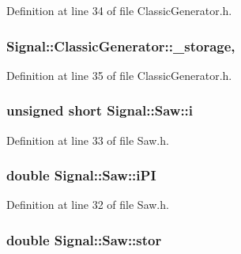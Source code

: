 Definition at line 34 of file Classic\+Generator.\+h.

\hypertarget{class_signal_1_1_classic_generator_a1214faf589eccb01631700723900bbf9}{
\subsubsection[{\+\_\+storage}]{ Signal\+::\+Classic\+Generator\+::\+\_\+storage\hspace{0.3cm}{\ttfamily [protected]}, {\ttfamily [inherited]}}}\label{class_signal_1_1_classic_generator_a1214faf589eccb01631700723900bbf9}


Definition at line 35 of file Classic\+Generator.\+h.

\hypertarget{class_signal_1_1_saw_a50612c8009e428dccb3e4b3b798bdf3d}{
\subsubsection[{i}]{\setlength{\rightskip}{0pt plus 5cm}unsigned short Signal\+::\+Saw\+::i\hspace{0.3cm}{\ttfamily [protected]}}}\label{class_signal_1_1_saw_a50612c8009e428dccb3e4b3b798bdf3d}


Definition at line 33 of file Saw.\+h.

\hypertarget{class_signal_1_1_saw_a75052e172f2d3c7ffc8daae2988f7305}{
\subsubsection[{i\+P\+I}]{\setlength{\rightskip}{0pt plus 5cm}double Signal\+::\+Saw\+::i\+P\+I\hspace{0.3cm}{\ttfamily [protected]}}}\label{class_signal_1_1_saw_a75052e172f2d3c7ffc8daae2988f7305}


Definition at line 32 of file Saw.\+h.

\hypertarget{class_signal_1_1_saw_a7c038cabed8c0b51136f16794c9142fd}{
\subsubsection[{stor}]{\setlength{\rightskip}{0pt plus 5cm}double Signal\+::\+Saw\+::stor\hspace{0.3cm}{\ttfamily [protected]}}}\label{class_signal_1_1_saw_a7c038cabed8c0b51136f16794c9142fd}


